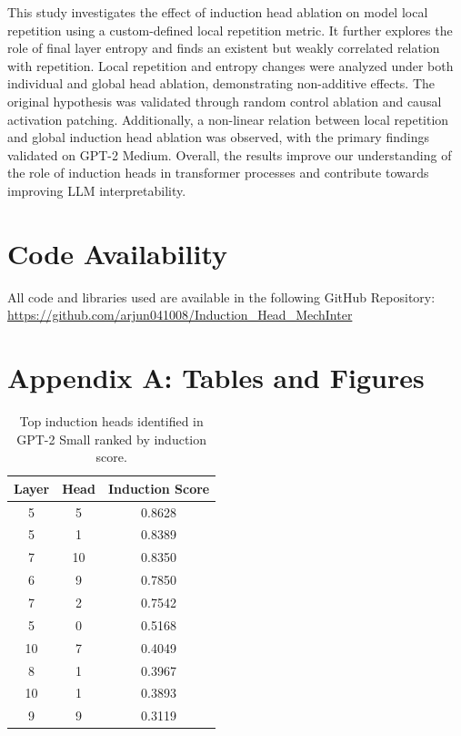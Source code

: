 \documentclass[twocolumn]{article}
\begin{document}
This study investigates the effect of induction head ablation on model local repetition using a custom-defined local repetition metric. It further explores the role of final layer entropy and finds an existent but weakly correlated relation with repetition. Local repetition and entropy changes were analyzed under both individual and global head ablation, demonstrating non-additive effects. The original hypothesis was validated through random control ablation and causal activation patching. Additionally, a non-linear relation between local repetition and global induction head ablation was observed, with the primary findings validated on GPT-2 Medium. Overall, the results improve our understanding of the role of induction heads in transformer processes and contribute towards improving LLM interpretability.

\section*{Code Availability}

All code and libraries used are available in the following GitHub Repository: \url{https://github.com/arjun041008/Induction_Head_MechInter}



\clearpage

\appendix
\onecolumn

\renewcommand{\thefigure}{A.\arabic{figure}}
\renewcommand{\thetable}{A.\arabic{table}}

\setcounter{figure}{0}
\setcounter{table}{0}

\section*{Appendix A: Tables and Figures}

\begin{table}[h]
\centering
\scriptsize
\begin{tabular}{ccc}
\hline
\textbf{Layer} & \textbf{Head} & \textbf{Induction Score} \\
\hline
5  & 5  & 0.8628 \\
5  & 1  & 0.8389 \\
7  & 10 & 0.8350 \\
6  & 9  & 0.7850 \\
7  & 2  & 0.7542 \\
5  & 0  & 0.5168 \\
10 & 7  & 0.4049 \\
8  & 1  & 0.3967 \\
10 & 1  & 0.3893 \\
9  & 9  & 0.3119 \\
\hline
\end{tabular}
\caption{Top induction heads identified in GPT-2 Small ranked by induction score.}
\label{tab:appendix_induction_heads}
\end{table}
\end{document}
